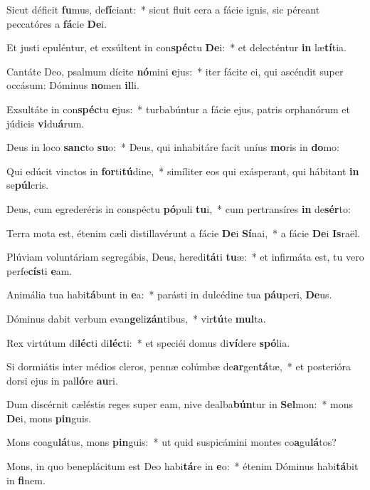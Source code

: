 \item Sicut déficit \textbf{fu}mus, de\textbf{fí}ciant:~* sicut fluit cera a fácie ignis, sic péreant peccatóres a \textbf{fá}cie \textbf{De}i.
\item Et justi epuléntur, et exsúltent in con\textbf{spéc}tu \textbf{De}i:~* et delecténtur \textbf{in} læ\textbf{tí}tia.
\item Cantáte Deo, psalmum dícite \textbf{nó}mini \textbf{e}jus:~* iter fácite ei, qui ascéndit super occásum: Dóminus \textbf{no}men \textbf{il}li.
\item Exsultáte in con\textbf{spéc}tu \textbf{e}jus:~* turbabúntur a fácie ejus, patris orphanórum et júdicis \textbf{vi}du\textbf{á}rum.
\item Deus in loco \textbf{sanc}to \textbf{su}o:~* Deus, qui inhabitáre facit uníus \textbf{mo}ris in \textbf{do}mo:
\item Qui edúcit vinctos in \textbf{for}ti\textbf{tú}dine,~* simíliter eos qui exásperant, qui hábitant \textbf{in} se\textbf{púl}cris.
\item Deus, cum egrederéris in conspéctu \textbf{pó}puli \textbf{tu}i,~* cum pertransíres \textbf{in} de\textbf{sér}to:
\item Terra mota est, étenim cæli distillavérunt a fácie \textbf{De}i \textbf{Sí}nai,~* a fácie \textbf{De}i \textbf{Is}raël.
\item Plúviam voluntáriam segregábis, Deus, heredi\textbf{tá}ti \textbf{tu}æ:~* et infirmáta est, tu vero perfe\textbf{cís}ti \textbf{e}am.
\item Animália tua habi\textbf{tá}bunt in \textbf{e}a:~* parásti in dulcédine tua \textbf{páu}peri, \textbf{De}us.
\item Dóminus dabit verbum evan\textbf{ge}li\textbf{zán}tibus,~* vir\textbf{tú}te \textbf{mul}ta.
\item Rex virtútum di\textbf{léc}ti di\textbf{léc}ti:~* et speciéi domus di\textbf{ví}dere \textbf{spó}lia.
\item Si dormiátis inter médios cleros, pennæ colúmbæ de\textbf{ar}gen\textbf{tá}tæ,~* et posterióra dorsi ejus in pal\textbf{ló}re \textbf{au}ri.
\item Dum discérnit cæléstis reges super eam, nive dealba\textbf{bún}tur in \textbf{Sel}mon:~* mons \textbf{De}i, mons \textbf{pin}guis.
\item Mons coagu\textbf{lá}tus, mons \textbf{pin}guis:~* ut quid suspicámini montes co\textbf{a}gu\textbf{lá}tos?
\item Mons, in quo beneplácitum est Deo habi\textbf{tá}re in \textbf{e}o:~* étenim Dóminus habi\textbf{tá}bit in \textbf{fi}nem.
